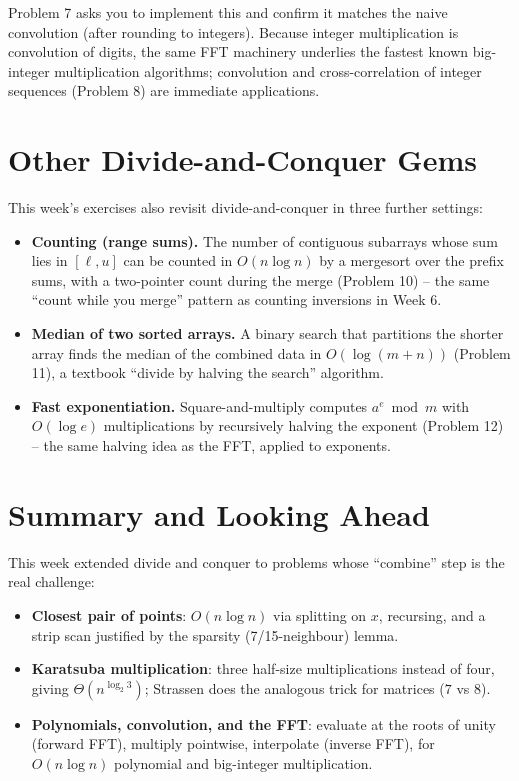 \documentclass[11pt]{article}
\begin{document}
Problem 7 asks you to implement this and confirm it matches the naive convolution (after
rounding to integers). Because integer multiplication is convolution of digits, the same FFT
machinery underlies the fastest known big-integer multiplication algorithms; convolution and
cross-correlation of integer sequences (Problem 8) are immediate applications.

\section{Other Divide-and-Conquer Gems}

This week's exercises also revisit divide-and-conquer in three further settings:

\begin{itemize}
    \item \textbf{Counting (range sums).} The number of contiguous subarrays whose sum lies
    in $[\ell, u]$ can be counted in $O(n \log n)$ by a mergesort over the prefix sums, with
    a two-pointer count during the merge (Problem 10) -- the same ``count while you merge''
    pattern as counting inversions in Week 6.
    \item \textbf{Median of two sorted arrays.} A binary search that partitions the shorter
    array finds the median of the combined data in $O(\log(m+n))$ (Problem 11), a textbook
    ``divide by halving the search'' algorithm.
    \item \textbf{Fast exponentiation.} Square-and-multiply computes $a^e \bmod m$ with
    $O(\log e)$ multiplications by recursively halving the exponent (Problem 12) -- the same
    halving idea as the FFT, applied to exponents.
\end{itemize}

\section{Summary and Looking Ahead}

This week extended divide and conquer to problems whose ``combine'' step is the real
challenge:

\begin{itemize}
    \item \textbf{Closest pair of points}: $O(n \log n)$ via splitting on $x$, recursing,
    and a strip scan justified by the sparsity (7/15-neighbour) lemma.
    \item \textbf{Karatsuba multiplication}: three half-size multiplications instead of four,
    giving $\Theta(n^{\log_2 3})$; Strassen does the analogous trick for matrices ($7$ vs
    $8$).
    \item \textbf{Polynomials, convolution, and the FFT}: evaluate at the roots of unity
    (forward FFT), multiply pointwise, interpolate (inverse FFT), for $O(n \log n)$
    polynomial and big-integer multiplication.
\end{itemize}
\end{document}
